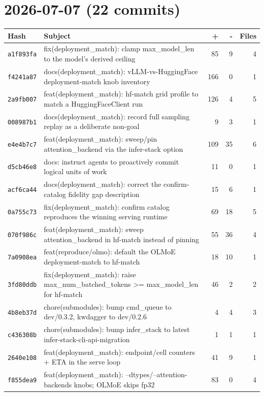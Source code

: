 \section*{2026-07-07 (22 commits)}
\begin{longtable}{@{}p{}p{}r r r@{}}
\toprule Hash & Subject & + & - & Files \\ \midrule\endhead
\texttt{a1f893fa} & fix(deployment\_match): clamp max\_model\_len to the model's derived ceiling & 85 & 9 & 4 \\
\texttt{f4241a87} & docs(deployment\_match): vLLM-vs-HuggingFace deployment-match knob inventory & 166 & 0 & 1 \\
\texttt{2a9fb007} & feat(deployment\_match): hf-match grid profile to match a HuggingFaceClient run & 126 & 4 & 5 \\
\texttt{008987b1} & docs(deployment\_match): record full sampling replay as a deliberate non-goal & 9 & 3 & 1 \\
\texttt{e4e4b7c7} & feat(deployment\_match): sweep/pin attention\_backend via the infer-stack option & 109 & 35 & 6 \\
\texttt{d5cb46e8} & docs: instruct agents to proactively commit logical units of work & 11 & 0 & 1 \\
\texttt{acf6ca44} & docs(deployment\_match): correct the confirm-catalog fidelity gap description & 15 & 6 & 1 \\
\texttt{0a755c73} & fix(deployment\_match): confirm catalog reproduces the winning serving runtime & 69 & 18 & 5 \\
\texttt{070f986c} & feat(deployment\_match): sweep attention\_backend in hf-match instead of pinning & 55 & 36 & 4 \\
\texttt{7a0908ea} & feat(reproduce/olmo): default the OLMoE deployment-match to hf-match & 18 & 10 & 1 \\
\texttt{3fd80ddb} & fix(deployment\_match): raise max\_num\_batched\_tokens >= max\_model\_len for hf-match & 46 & 2 & 2 \\
\texttt{4b8eb37d} & chore(submodules): bump cmd\_queue to dev/0.3.2, kwdagger to dev/0.2.6 & 4 & 4 & 3 \\
\texttt{c436308b} & chore(submodules): bump infer\_stack to latest infer-stack-cli-api-migration & 1 & 1 & 1 \\
\texttt{2640e108} & feat(deployment\_match): endpoint/cell counters + ETA in the serve loop & 41 & 9 & 1 \\
\texttt{f855dea9} & feat(deployment\_match): --dtypes/--attention-backends knobs; OLMoE skips fp32 & 83 & 0 & 4 \\

\end{longtable}
